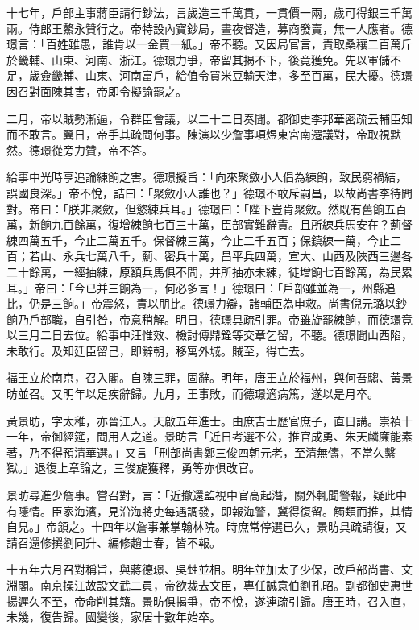 \begin{pinyinscope}
十七年，戶部主事蔣臣請行鈔法，言歲造三千萬貫，一貫價一兩，歲可得銀三千萬兩。侍郎王鰲永贊行之。帝特設內寶鈔局，晝夜督造，募商發賣，無一人應者。德璟言：「百姓雖愚，誰肯以一金買一紙。」帝不聽。又因局官言，責取桑穰二百萬斤於畿輔、山東、河南、浙江。德璟力爭，帝留其揭不下，後竟獲免。先以軍儲不足，歲僉畿輔、山東、河南富戶，給值令買米豆輸天津，多至百萬，民大擾。德璟因召對面陳其害，帝即令擬諭罷之。

二月，帝以賊勢漸逼，令群臣會議，以二十二日奏聞。都御史李邦華密疏云輔臣知而不敢言。翼日，帝手其疏問何事。陳演以少詹事項煜東宮南遷議對，帝取視默然。德璟從旁力贊，帝不答。

給事中光時亨追論練餉之害。德璟擬旨：「向來聚斂小人倡為練餉，致民窮禍結，誤國良深。」帝不悅，詰曰：「聚斂小人誰也？」德璟不敢斥嗣昌，以故尚書李待問對。帝曰：「朕非聚斂，但慾練兵耳。」德璟曰：「陛下豈肯聚斂。然既有舊餉五百萬，新餉九百餘萬，復增練餉七百三十萬，臣部實難辭責。且所練兵馬安在？薊督練四萬五千，今止二萬五千。保督練三萬，今止二千五百；保鎮練一萬，今止二百；若山、永兵七萬八千，薊、密兵十萬，昌平兵四萬，宣大、山西及陜西三邊各二十餘萬，一經抽練，原額兵馬俱不問，并所抽亦未練，徒增餉七百餘萬，為民累耳。」帝曰：「今已并三餉為一，何必多言！」德璟曰：「戶部雖並為一，州縣追比，仍是三餉。」帝震怒，責以朋比。德璟力辯，諸輔臣為申救。尚書倪元璐以鈔餉乃戶部職，自引咎，帝意稍解。明日，德璟具疏引罪。帝雖旋罷練餉，而德璟竟以三月二日去位。給事中汪惟效、檢討傅鼎銓等交章乞留，不聽。德璟聞山西陷，未敢行。及知廷臣留己，即辭朝，移寓外城。賊至，得亡去。

福王立於南京，召入閣。自陳三罪，固辭。明年，唐王立於福州，與何吾騶、黃景昉並召。又明年以足疾辭歸。九月，王事敗，而德璟適病篤，遂以是月卒。

黃景昉，字太稚，亦晉江人。天啟五年進士。由庶吉士歷官庶子，直日講。崇禎十一年，帝御經筵，問用人之道。景昉言「近日考選不公，推官成勇、朱天麟廉能素著，乃不得預清華選。」又言「刑部尚書鄭三俊四朝元老，至清無儔，不當久繫獄。」退復上章論之，三俊旋獲釋，勇等亦俱改官。

景昉尋進少詹事。嘗召對，言：「近撤還監視中官高起潛，關外輒聞警報，疑此中有隱情。臣家海濱，見沿海將吏每遇調發，即報海警，冀得復留。觸類而推，其情自見。」帝頷之。十四年以詹事兼掌翰林院。時庶常停選已久，景昉具疏請復，又請召還修撰劉同升、編修趙士春，皆不報。

十五年六月召對稱旨，與蔣德璟、吳甡並相。明年並加太子少保，改戶部尚書、文淵閣。南京操江故設文武二員，帝欲裁去文臣，專任誠意伯劉孔昭。副都御史惠世揚遲久不至，帝命削其籍。景昉俱揭爭，帝不悅，遂連疏引歸。唐王時，召入直，未幾，復告歸。國變後，家居十數年始卒。


\end{pinyinscope}

